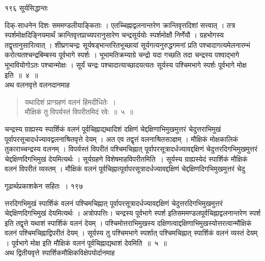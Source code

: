 \documentclass[11pt, openany]{book}
\begin{document}
\cfoot{}

\noindent १९६ \hspace{4cm} सूर्यसिद्धान्तः
\vspace{1cm}


\noindent दिक्-साधनेन दिशः सममण्डलीयाङ्किताः । एतच्चिह्नाद्वलनान्तरेण क्रान्तिवृत्तदिशां सत्त्वात् । तत्र स्पर्शमोक्षदिङ्नियमार्थं क्रान्तिवृत्तप्राच्यपरानुसारेण चन्द्रसूर्ययोः स्पर्शमोक्षौ निर्णेयौ । ग्रहभोगस्य तद्वृत्तानुसारित्वात् । शीघ्रगचन्द्रः सूर्यषड्भान्तरितभूच्छायां सूर्यगत्यनुरुद्धगमनां प्रति पश्चादागत्यमेलनारम्भं करोत्यतश्चन्द्रबिम्बस्य पूर्वभागे स्पर्शः । भूभामतिक्रम्याग्रे चन्द्रो यदा गच्छति तदा चन्द्रस्य पश्वाद्भागे भूभावियोगोऽतः पश्चान्मोक्षः । सूर्यं चन्द्रः पश्चादात्याच्छादयत्यतः सूर्यस्य पश्चिमभागे स्पर्शः पूर्वभागे मोक्ष इति~॥~४~॥\\
\noindent अथ वलनवृत्ते वलनदानमाह \textendash


\begin{quote}
{\ssi यथादिशं प्राग्ग्रहणं वलनं हिमदीधितेः~।\\
 मौक्षिकं तु विपर्यस्तं विपरीतमिदं रवेः~॥~५~॥ }
 \end{quote}


 चन्द्रस्य ग्राह्यस्य स्पार्शिकं वलनं पूर्वचिह्नाद्यथादिशं दक्षिणं चेद्दक्षिणाभिमुखमुत्तरं चेदुत्तराभिमुखं पूर्वापरसूचादर्धज्यावद्वलनाश्रितवृत्ते देयम् । अत एव तद्वृत्तं वलनाश्रितसञ्ज्ञम् । मौक्षिकं मोक्षकालिकं तुकाराच्चन्द्रस्य वलनम् । विपर्यस्तं विपरीतं पश्चिमचिह्नात् पूर्वापरसूत्रादर्धज्यावद्दक्षिणं चेदुत्तरदिगभिमुखमुत्तरं चेद्दक्षिणदिगभिमुखं देयमित्यर्थः । सूर्यग्रहणे विशेषमाह\textendash विपरीतमिति~। सूर्यस्य ग्राह्यस्येदं स्पार्शिकं मौक्षिकं वलनं विपरीतं व्यस्तम् । मौक्षिकं वलनं पूर्वचिह्नात्पूर्वापरसूत्रादर्धज्यावद्दक्षिणं चेद्दक्षिणदिगभिमुखमुत्तरं चेदु\textendash


\newpage

\hspace{3.5cm} गूढार्थप्रकाशकेन सहितः~। \hfill १९७
\vspace{1cm}


\noindent त्तरदिगभिमुखं स्पार्शिकं वलनं पश्चिमचिह्नात् पूर्वापरसूत्रादर्धज्यावद्दक्षिणं चेदुत्तरदिगभिमुखमुत्तरं चेद्दक्षिणदिगभिमुखं देयमित्यर्थः । अत्रोपपत्तिः। चन्द्रस्य पूर्वभागे स्पर्श इतिसममण्डलपूर्वचिह्नाद्वलनान्तरेण स्पर्श इति तद्वृत्ते यथाशं स्पार्शिकं वलनं देयम् । पश्चिमोत्तराभिमुखस्य दक्षिणत्वाद्दक्षिणाभिमुखस्योत्तरत्वान्मौक्षिकं वलनं पश्चिमचिह्नाद्विपरीतं देयम् । सूर्यस्य तु पश्चिमभागे स्पर्शात् पश्चिमचिह्नात् स्पार्शिकं वलनं व्यस्तं देयम् । पूर्वभागे मोक्ष इति मौक्षिकं वलनं पूर्वचिह्नाद्यथाशं देवमिति~॥~५~॥\\
\noindent अथ द्वितीयवृत्ते स्पार्शिकमौक्षिकविक्षेपयोर्दानमाह\textendash
\end{document}
